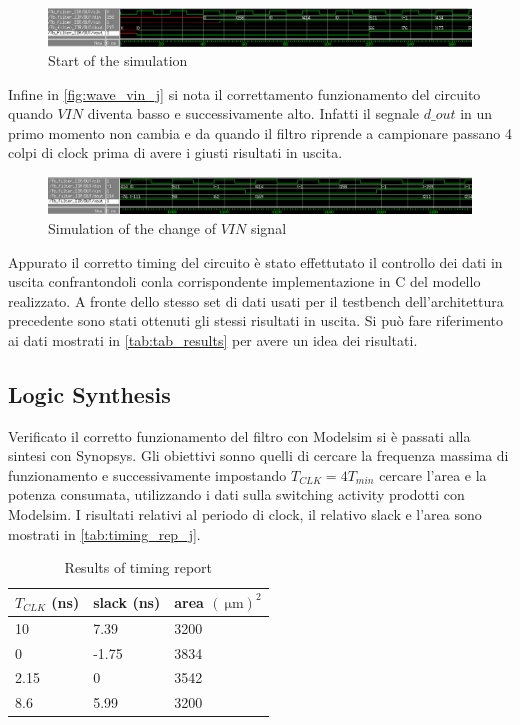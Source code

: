 \begin{figure}[h]
	\center
	\includegraphics[width=1\textwidth]{images/wave_start_j_look_ahead.png}
	\caption{Start of the simulation}
	\label{fig:wave_start_j}
\end{figure}

Infine in \autoref{fig:wave_vin_j} si nota il correttamento funzionamento del circuito quando $VIN$ diventa basso e successivamente alto. Infatti il segnale $d\_out$ in un primo momento non cambia e da quando il filtro riprende a campionare passano 4 colpi di clock prima di avere i giusti risultati in uscita.

\begin{figure}[h]
	\center
	\includegraphics[width=1\textwidth]{images/wave_vin_0_1_j_look_ahead.png}
	\caption{Simulation of the change of $VIN$ signal}
	\label{fig:wave_vin_j}
\end{figure}

Appurato il corretto timing del circuito è stato effettutato il controllo dei dati in uscita confrantondoli conla corrispondente implementazione in C del modello realizzato. A fronte dello stesso set di dati usati per il testbench dell'architettura precedente sono stati ottenuti gli stessi risultati in uscita. Si può fare riferimento ai dati mostrati in \autoref{tab:tab_results} per avere un idea dei risultati.


\subsection{Logic Synthesis}
Verificato il corretto funzionamento del filtro con Modelsim si è passati alla sintesi con Synopsys. Gli obiettivi sonno quelli di cercare la frequenza massima di funzionamento e successivamente impostando $T_{CLK} = 4 T_{min}$ cercare l'area e la potenza consumata, utilizzando i dati sulla switching activity prodotti con Modelsim.
I risultati relativi al periodo di clock, il relativo slack e l'area sono mostrati in \autoref{tab:timing_rep_j}.

\begin{table}[h]
\begin{center}
\begin{tabular}{|l|l|l|}
\hline
$T_{CLK}$ (ns) & slack (ns) & area $(\SI{}{\micro\meter})^2$ \\
\hline
10 & 7.39 &  3200\\
0 & -1.75 &  3834\\
2.15 & 0 & 3542 \\
8.6 & 5.99 & 3200 \\
\hline
\end{tabular}
\end{center}
\caption{Results of timing report}
\label{tab:timing_rep_j}
\end{table}

